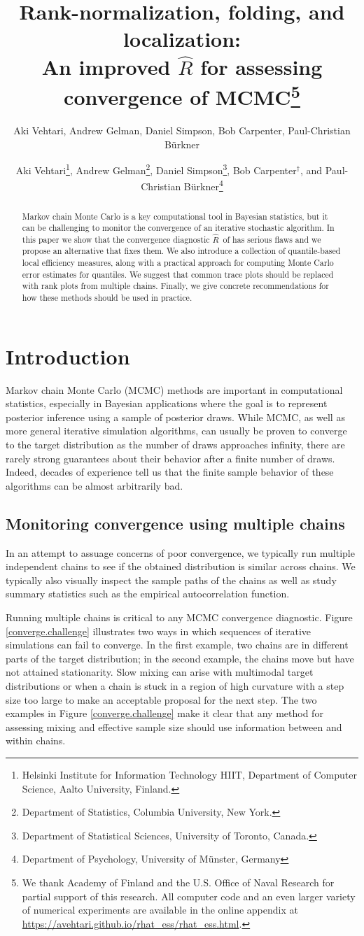 \documentclass[american,]{article}
\title{Rank-normalization, folding, and localization:\\
  An improved $\widehat{R}$ for assessing convergence of MCMC\footnote{We thank Academy of Finland and the U.S. Office of Naval Research for partial support of this research.  All computer code and an 
even larger variety of numerical experiments are available in the online 
appendix at \url{https://avehtari.github.io/rhat_ess/rhat_ess.html}.}\vspace{.1in}}
\author{Aki Vehtari, Andrew Gelman, Daniel Simpson, Bob Carpenter, Paul-Christian Bürkner}
\author{
Aki Vehtari\footnote{Helsinki Institute for Information Technology HIIT,
  Department of Computer Science, Aalto University, Finland.},
   Andrew Gelman\footnote{Department of Statistics, Columbia University, New York.},
 Daniel Simpson\footnote{Department of Statistical Sciences, University of Toronto, Canada.},
 Bob Carpenter$^{\dagger}$,
and Paul-Christian B\"{u}rkner\footnote{Department of Psychology, University of M\"{u}nster, Germany}
}
\newcommand{\Rhat}{$\widehat{R}$}
\theoremstyle{definition}
\begin{document}
\maketitle
\begin{abstract}
  Markov chain Monte Carlo is a key computational tool in Bayesian 
  statistics, but it can be challenging to monitor the convergence of an iterative stochastic algorithm.
In this paper we show that the convergence diagnostic \Rhat\ 
of \citet{Gelman+Rubin:1992} has serious flaws and we
propose an alternative that fixes them. We also introduce
  a collection of quantile-based local efficiency
  measures, along with a practical approach for computing Monte Carlo error
  estimates for quantiles. We suggest that common trace plots should
  be replaced with rank plots from multiple chains. Finally, we give
  concrete recommendations for how these methods should be used
  in practice.
\end{abstract}

\hypertarget{introduction}{%
\section{Introduction}\label{introduction}}

Markov chain Monte Carlo (MCMC) methods are important in computational statistics, especially 
in Bayesian applications where the goal is to represent
posterior inference using a sample of posterior draws. While MCMC, 
as well as more general iterative
simulation algorithms, can usually be proven to converge
to the target distribution as the number of draws approaches infinity,
there are rarely strong guarantees about their behavior after a 
finite number of draws. Indeed, decades of experience tell us that
the finite sample behavior of these algorithms can be almost arbitrarily bad.


\subsection{Monitoring convergence using multiple chains}


In an attempt to assuage concerns of poor convergence, we typically run multiple 
independent chains  to see if the obtained 
distribution is similar across chains.  We typically also visually inspect
the sample paths of the chains as well as study summary statistics such as
 the empirical autocorrelation function. 

Running multiple chains is critical to any MCMC convergence diagnostic. Figure
\ref{converge.challenge} illustrates two ways in which sequences of
iterative simulations can fail to converge.  In the first example, two chains
are in different parts of the target distribution; in the second
example, the chains move but have not attained stationarity. Slow mixing can arise with multimodal target distributions or when a chain is
stuck in a region of high curvature with a step size too large to make an
acceptable proposal for the next step. The two examples in Figure \ref{converge.challenge}  make it clear that 
any method for assessing mixing and effective sample size should use information
between and within chains.
\end{document}
